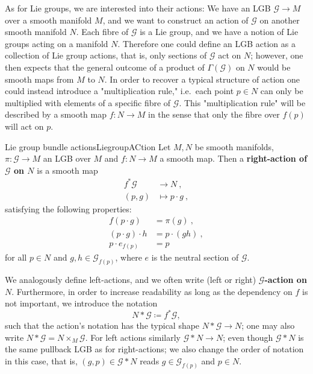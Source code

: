 \documentclass[reqno,a4paper,oneside]{amsart}
\theoremstyle{plain}
\theoremstyle{remark}
\theoremstyle{definition}
\begin{document}
As for Lie groups, we are interested into their actions: We have an LGB $\mathcal{G} \to M$ over a smooth manifold $M$, and we want to construct an action of $\mathcal{G}$ on another smooth manifold $N$. Each fibre of $\mathcal{G}$ is a Lie group, and we have a notion of Lie groups acting on a manifold $N$. Therefore one could define an LGB action as a collection of Lie group actions, that is, only sections of $\mathcal{G}$ act on $N$; however, one then expects that the general outcome of a product of $\Gamma(\mathcal{G})$ on $N$ would be smooth maps from $M$ to $N$. In order to recover a typical structure of action one could instead introduce a "multiplication rule," i.e.\ each point $p \in N$ can only be multiplied with elements of a specific fibre of $\mathcal{G}$. This "multiplication rule" will be described by a smooth map $f\colon N \to M$ in the sense that only the fibre over $f(p)$ will act on $p$.

\begin{definitions}{Lie group bundle actions}{LiegroupACtion}
Let $M, N$ be smooth manifolds, $\pi\colon\mathcal{G} \to M$ an LGB over $M$ and $f\colon N \to M$ a smooth map. Then a \textbf{right-action of $\mathcal{G}$ on $N$} is a smooth map 
\begin{align*}
f^*\mathcal{G} &\to N~,\\
(p, g) &\mapsto p \cdot g~,
\end{align*}
satisfying the following properties:
\begin{align*}
f(p \cdot g) &= \pi(g)~,\\
(p \cdot g) \cdot h &= p \cdot (gh)~,\\
p \cdot e_{f(p)} &= p
\end{align*}
for all $p \in N$ and $g, h \in \mathcal{G}_{f(p)}$, where $e$ is the neutral section of $\mathcal{G}$.
\newline

We analogously define left-actions, and we often write (left or right) \textbf{$\mathcal{G}$-action on $N$}. Furthermore, in order to increase readability as long as the dependency on $f$ is not important, we introduce the notation
\begin{equation*}
N * \mathcal{G}
\coloneqq
f^*\mathcal{G},
\end{equation*}
such that the action's notation has the typical shape $N * \mathcal{G} \to N$; one may also write $N * \mathcal{G} = N \times_M \mathcal{G}$. For left actions similarly $\mathcal{G} * N \to N$; even though $\mathcal{G} * N$ is the same pullback LGB as for right-actions; we also change the order of notation in this case, that is, $(g, p) \in \mathcal{G} * N$ reads $g \in \mathcal{G}_{f(p)}$ and $p \in N$. 
\end{definitions}
\end{document}
